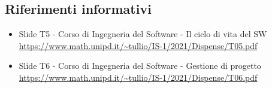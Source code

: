 \subsection{Riferimenti informativi}
\begin{itemize}
  \item Slide T5 - Corso di Ingegneria del Software - Il ciclo di vita del SW \\
  \url{https://www.math.unipd.it/~tullio/IS-1/2021/Dispense/T05.pdf}
  \item Slide T6 - Corso di Ingegneria del Software - Gestione di progetto \\
  \url{https://www.math.unipd.it/~tullio/IS-1/2021/Dispense/T06.pdf}
\end{itemize}